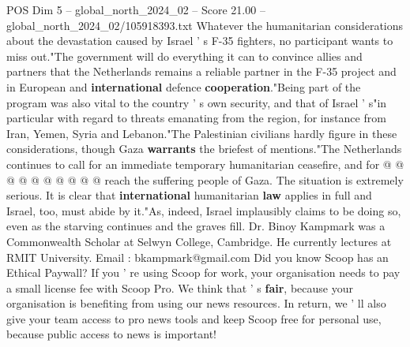 \begin{textsample}{POS Dim 5 – global\_north\_2024\_02 – Score 21.00 – global\_north\_2024\_02/105918393.txt}
Whatever the humanitarian considerations about the devastation caused by Israel ' s F-35 fighters, no participant wants to miss out."The government will do everything it can to convince allies and partners that the Netherlands remains a reliable partner in the F-35 project and in European and \textbf{international} defence \textbf{cooperation}."Being part of the program was also vital to the country ' s own security, and that of Israel ' s"in particular with regard to threats emanating from the region, for instance from Iran, Yemen, Syria and Lebanon."The Palestinian civilians hardly figure in these considerations, though Gaza \textbf{warrants} the briefest of mentions."The Netherlands continues to call for an immediate temporary humanitarian ceasefire, and for @ @ @ @ @ @ @ @ @ @ reach the suffering people of Gaza.
The situation is extremely serious.
It is clear that \textbf{international} humanitarian \textbf{law} applies in full and Israel, too, must abide by it."As, indeed, Israel implausibly claims to be doing so, even as the starving continues and the graves fill.
Dr.
Binoy Kampmark was a Commonwealth Scholar at Selwyn College, Cambridge.
He currently lectures at RMIT University.
Email : bkampmark@gmail.com Did you know Scoop has an Ethical Paywall?
If you ' re using Scoop for work, your organisation needs to pay a small license fee with Scoop Pro.
We think that ' s \textbf{fair}, because your organisation is benefiting from using our news resources.
In return, we ' ll also give your team access to pro news tools and keep Scoop free for personal use, because public access to news is important!

\end{textsample}
